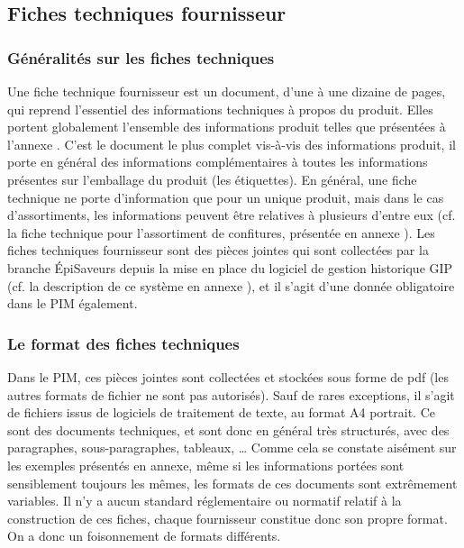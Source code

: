             \subsection{Fiches techniques fournisseur}
            \label{fiches_techniques}

                \subsubsection{Généralités sur les fiches techniques}
            Une fiche technique fournisseur est un document, d'une à une dizaine de pages, qui reprend l'essentiel des informations techniques à propos du produit.
            Elles portent globalement l'ensemble des informations produit telles que présentées à l'annexe .
            C'est le document le plus complet vis-à-vis des informations produit, il porte en général des informations complémentaires à toutes les informations présentes sur l'emballage du produit (les étiquettes).
            En général, une fiche technique ne porte d'information que pour un unique produit, mais dans le cas d'assortiments, les informations peuvent être relatives à plusieurs d'entre eux (cf. la fiche technique pour l'assortiment de confitures, présentée en annexe ).
            Les fiches techniques fournisseur sont des pièces jointes qui sont collectées par la branche \'{E}piSaveurs depuis la mise en place du logiciel de gestion historique GIP (cf. la description de ce système en annexe ), et il s'agit d'une donnée obligatoire dans le PIM également.
            
                \subsubsection{Le format des fiches techniques}
            Dans le PIM, ces pièces jointes sont collectées et stockées sous forme de pdf (les autres formats de fichier ne sont pas autorisés).
            Sauf de rares exceptions, il s'agit de fichiers issus de logiciels de traitement de texte, au format A4 portrait.
            Ce sont des documents techniques, et sont donc en général très structurés, avec des paragraphes, sous-paragraphes, tableaux, \dots
            Comme cela se constate aisément sur les exemples présentés en annexe, même si les informations portées sont sensiblement toujours les mêmes, les formats de ces documents sont extrêmement variables.
            Il n'y a aucun standard réglementaire ou normatif relatif à la construction de ces fiches, chaque fournisseur constitue donc son propre format.
            On a donc un foisonnement de formats différents.


